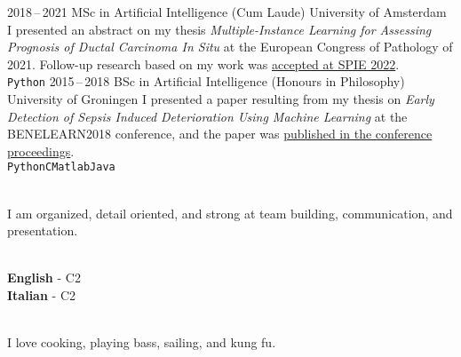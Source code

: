 \documentclass[9pt]{developercv}
\begin{document}


\begin{entrylist}
\entry
    {2018\,--\,2021}
    {MSc in Artificial Intelligence (Cum Laude)}
    {University of Amsterdam}
    {I presented an abstract on my thesis \emph{Multiple-Instance Learning for Assessing Prognosis of Ductal Carcinoma In Situ} at the European Congress of Pathology of 2021. Follow-up research based on my work was \href{https://doi.org/10.1117/12.2612838}{accepted at SPIE 2022}.\\
    \texttt{Python}}
\entry
    {2015\,--\,2018}
    {BSc in Artificial Intelligence (Honours in Philosophy)}
    {University of Groningen}
    {I presented a paper resulting from my thesis on \emph{Early Detection of Sepsis Induced Deterioration Using Machine Learning} at the BENELEARN2018 conference, and the paper was \href{https://doi.org/10.1007/978-3-030-31978-6_1}{published in the conference proceedings}.\\
    \texttt{Python}\dotsepb\texttt{C}\dotsepb\texttt{Matlab}\dotsepb\texttt{Java}}
\end{entrylist}


\begin{minipage}[t]{0.45\textwidth}
    \vspace{-\baselineskip}
    \\
    I am organized, detail oriented, and strong at team building, communication, and presentation.
\end{minipage}
\hfill
\begin{minipage}[t]{0.225\textwidth}
    \vspace{-\baselineskip}
    \\
    \textbf{English} - C2\\
    \textbf{Italian} - C2
\end{minipage}
\hfill
\begin{minipage}[t]{0.225\textwidth}
    \vspace{-\baselineskip}
    \\
    I love cooking, playing bass, sailing, and kung fu.
\end{minipage}
\end{document}
